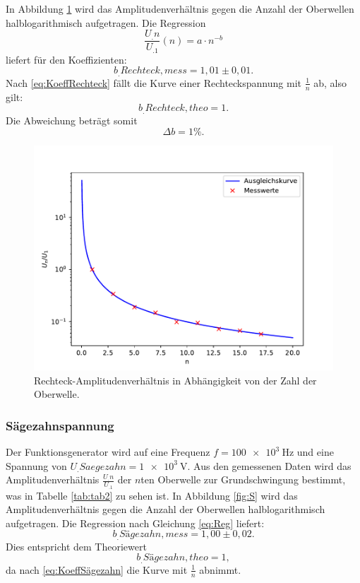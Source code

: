\noindent In Abbildung \ref{fig:R} wird das Amplitudenverhältnis gegen die Anzahl der Oberwellen halblogarithmisch aufgetragen. Die Regression 
\begin{equation}
\frac{U_.n}{U_.1}(n) = a \cdot n^{-b}\label{eq:Reg}
\end{equation}
liefert für den Koeffizienten:
\[
b_.{Rechteck,mess}= 1,01 \pm 0,01\text{.}
\]
Nach \eqref{eq:KoeffRechteck} fällt die Kurve einer Rechteckspannung mit $\frac{1}{n}$ ab, also gilt:
\[
b_.{Rechteck,theo}= 1\text{.}
\]
Die Abweichung beträgt somit
\[
\Delta b = 1\% \text{.}
\]

\begin{figure}
\centering
\includegraphics[width=\linewidth-75pt,height=\textheight-75pt,keepaspectratio]{content/images/rechteck.pdf}
\caption{Rechteck-Amplitudenverhältnis in Abhängigkeit von der Zahl der Oberwelle.}\label{fig:R}
\end{figure}

\subsubsection{Sägezahnspannung}
Der Funktionsgenerator wird auf eine Frequenz $f=\SI{100e3}{\hertz}$ und eine Spannung von $U_.{Saegezahn} = \SI{1e3}{\volt}$.\newline
Aus den gemessenen Daten wird das Amplitudenverhältnis $\frac{U_.n}{U_.1}$ der $n$ten Oberwelle zur Grundschwingung bestimmt, was in Tabelle \ref{tab:tab2} zu sehen ist. In Abbildung \ref{fig:S} wird das Amplitudenverhältnis gegen die Anzahl der Oberwellen halblogarithmisch aufgetragen. Die Regression nach Gleichung \eqref{eq:Reg} liefert:
\[
b_.{Sägezahn,mess} = 1,00 \pm 0,02\text{.}
\]
Dies entspricht dem Theoriewert 
\[
b_.{Sägezahn,theo} = 1,
\]
da nach \eqref{eq:KoeffSägezahn} die Kurve mit $\frac{1}{n}$ abnimmt.


